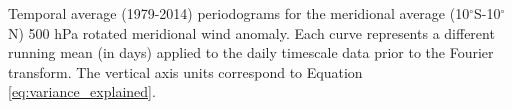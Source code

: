 \label{fig:periodogram}
Temporal average (1979-2014) periodograms for the meridional average (10$^{\circ}$S-10$^{\circ}$N) 500 hPa rotated meridional wind anomaly. Each curve represents a different running mean (in days) applied to the daily timescale data prior to the Fourier transform. The vertical axis units correspond to Equation \ref{eq:variance_explained}.